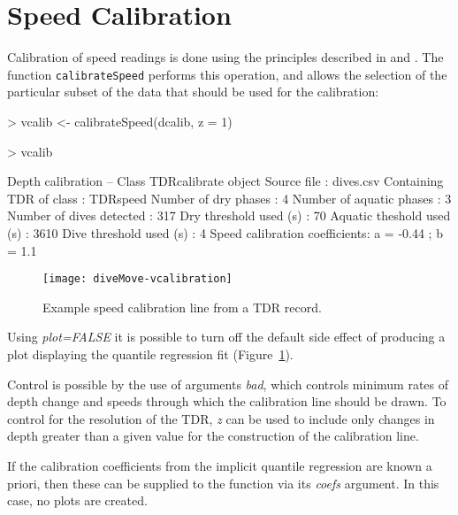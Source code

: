 \documentclass[12pt, letterpaper]{scrartcl}
\newcommand{\Rfunction}[1]{{\texttt{#1}}}
\newcommand{\Rfunarg}[1]{{\textit{#1}}}
\begin{document}
\section{Speed Calibration}
\label{sec:speed}

Calibration of speed readings is done using the principles described in
\citet{1929} and \citet{1291}.  The function \Rfunction{calibrateSpeed}
performs this operation, and allows the selection of the particular subset
of the data that should be used for the calibration:

\begin{Schunk}
\begin{Sinput}
> vcalib <- calibrateSpeed(dcalib, z = 1)
\end{Sinput}
\end{Schunk}
\begin{Schunk}
\begin{Sinput}
> vcalib
\end{Sinput}
\begin{Soutput}
Depth calibration -- Class TDRcalibrate object
  Source file                   : dives.csv 
  Containing TDR of class       : TDRspeed 
  Number of dry phases          : 4 
  Number of aquatic phases      : 3 
  Number of dives detected      : 317 
  Dry threshold used (s)        : 70 
  Aquatic theshold used (s)     : 3610 
  Dive threshold used (s)       : 4
  Speed calibration coefficients: a = -0.44 ; b = 1.1 
\end{Soutput}
\end{Schunk}
\begin{figure}[hbtp]
  \centering
  \texttt{[image: diveMove-vcalibration]}
  \caption{Example speed calibration line from a TDR record.}
  \label{fig:rqplots}
\end{figure}

Using \Rfunarg{plot=FALSE} it is possible to turn off the default side
effect of producing a plot displaying the quantile regression fit
(Figure~\ref{fig:rqplots}).

Control is possible by the use of arguments \Rfunarg{bad}, which controls
minimum rates of depth change and speeds through which the calibration
line should be drawn.  To control for the resolution of the TDR,
\Rfunarg{z} can be used to include only changes in depth greater than a
given value for the construction of the calibration line.

If the calibration coefficients from the implicit quantile regression are
known a priori, then these can be supplied to the function via its
\Rfunarg{coefs} argument.  In this case, no plots are created.
\end{document}

